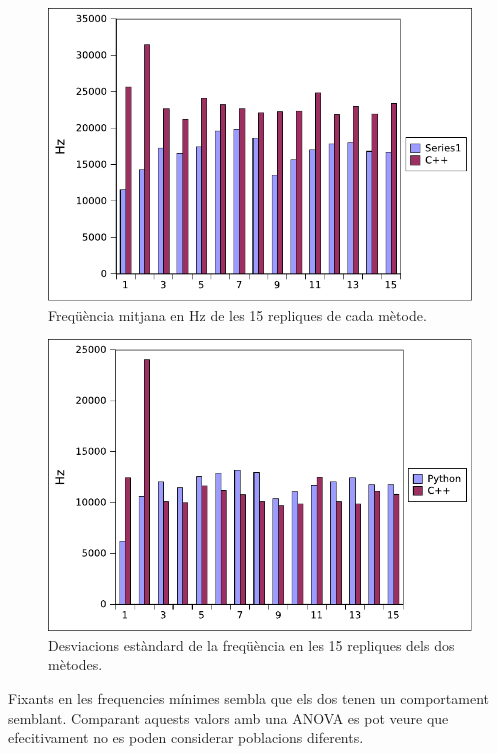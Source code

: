 \documentclass[12pt,a4paper,final,twoside]{article}
\begin{document}
\begin{figure}[H]
	\centering
    \includegraphics[scale=1]{images/MitJoint.pdf}
	 \caption{Freqüència mitjana en Hz de les 15 repliques de cada mètode.}
  \label{fig:MitJoint}
\end{figure}
\begin{figure}[H]
	\centering
    \includegraphics[scale=1]{images/DevJoint.pdf}
	 \caption{Desviacions estàndard de la freqüència en les 15 repliques dels dos mètodes.}
  \label{fig:DevJoint}
\end{figure}
Fixants en les frequencies mínimes sembla que els dos tenen un comportament semblant. Comparant aquests valors amb una ANOVA es pot veure que efecitivament no es poden considerar poblacions diferents.
\end{document}
